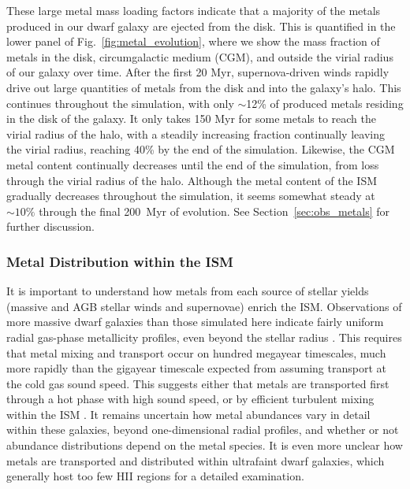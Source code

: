 \documentclass[twocolumn]{aastex61}
\begin{document}
These large metal mass loading factors indicate that a majority of the metals produced in our dwarf galaxy are ejected from the disk. This is quantified in the lower panel of Fig.~\ref{fig:metal_evolution}, where we show the mass fraction of metals in the disk, circumgalactic medium (CGM), and outside the virial radius of our galaxy over time. After the first 20 Myr, supernova-driven winds rapidly drive out large quantities of metals from the disk and into the galaxy's halo. This continues throughout the simulation, with only $\sim$12\% of produced metals residing in the disk of the galaxy. It only takes 150 Myr for some metals to reach the virial radius of the halo, with a steadily increasing fraction continually leaving the virial radius, reaching 40\% by the end of the simulation. Likewise, the CGM metal content continually decreases until the end of the simulation, from loss through the virial radius of the halo. Although the metal content of the ISM gradually decreases throughout the simulation, it seems somewhat steady at $\sim 10\%$ through the final 200~Myr of evolution. See Section~\ref{sec:obs_metals} for further discussion.

\subsubsection{Metal Distribution within the ISM}

It is important to understand how metals from each source of stellar yields (massive and AGB stellar winds and supernovae) enrich the ISM. Observations of more massive dwarf galaxies than those simulated here indicate fairly uniform radial gas-phase metallicity profiles, even beyond the stellar radius \citep[e.g.][]{Werk2011,Belfiore2017}. This requires that metal mixing and transport occur on hundred megayear timescales, much more rapidly than the gigayear timescale expected from assuming transport at the cold gas sound speed. This suggests either that metals are transported first through a hot phase 
   with high sound speed, 
or by efficient turbulent mixing within the ISM \citep[e.g.][]{Tassis2008,YangKrumholz2012}. It remains uncertain how metal abundances vary in detail within these galaxies, beyond one-dimensional radial profiles, and whether or not abundance distributions depend on the metal species. It is even more unclear how metals are transported and distributed within ultrafaint dwarf galaxies, which generally host too few HII regions for a detailed examination.
\end{document}
